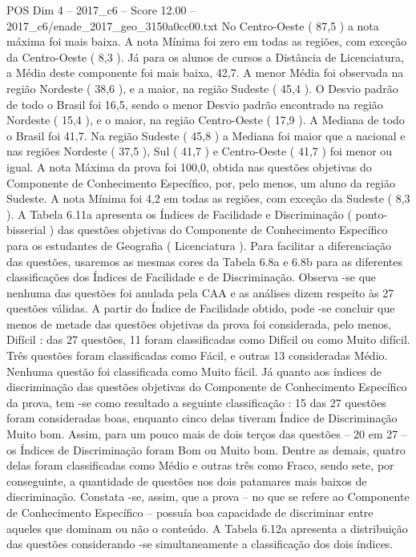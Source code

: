 \begin{textsample}{POS Dim 4 – 2017\_c6 – Score 12.00 – 2017\_c6/enade\_2017\_geo\_3150a0cc00.txt}
No Centro-Oeste ( 87,5 ) a nota máxima foi mais baixa.
A nota Mínima foi zero em todas as regiões, com exceção da Centro-Oeste ( 8,3 ).
Já para os alunos de cursos a Distância de Licenciatura, a Média deste componente foi mais baixa, 42,7.
A menor Média foi observada na região Nordeste ( 38,6 ), e a maior, na região Sudeste ( 45,4 ).
O Desvio padrão de todo o Brasil foi 16,5, sendo o menor Desvio padrão encontrado na região Nordeste ( 15,4 ), e o maior, na região Centro-Oeste ( 17,9 ).
A Mediana de todo o Brasil foi 41,7.
Na região Sudeste ( 45,8 ) a Mediana foi maior que a nacional e nas regiões Nordeste ( 37,5 ), Sul ( 41,7 ) e Centro-Oeste ( 41,7 ) foi menor ou igual.
A nota Máxima da prova foi 100,0, obtida nas questões objetivas do Componente de Conhecimento Específico, por, pelo menos, um aluno da região Sudeste.
A nota Mínima foi 4,2 em todas as regiões, com exceção da Sudeste ( 8,3 ).
A Tabela 6.11a apresenta os Índices de Facilidade e Discriminação ( ponto-bisserial ) das questões objetivas do Componente de Conhecimento Específico para os estudantes de Geografia ( Licenciatura ).
Para facilitar a diferenciação das questões, usaremos as mesmas cores da Tabela 6.8a e 6.8b para as diferentes classificações dos Índices de Facilidade e de Discriminação.
Observa -se que nenhuma das questões foi anulada pela CAA e as análises dizem respeito às 27 questões válidas.
A partir do Índice de Facilidade obtido, pode -se concluir que menos de metade das questões objetivas da prova foi considerada, pelo menos, Difícil : das 27 questões, 11 foram classificadas como Difícil ou como Muito difícil.
Três questões foram classificadas como Fácil, e outras 13 consideradas Médio.
Nenhuma questão foi classificada como Muito fácil.
Já quanto aos índices de discriminação das questões objetivas do Componente de Conhecimento Específico da prova, tem -se como resultado a seguinte classificação : 15 das 27 questões foram consideradas boas, enquanto cinco delas tiveram Índice de Discriminação Muito bom.
Assim, para um pouco mais de dois terços das questões – 20 em 27 – os Índices de Discriminação foram Bom ou Muito bom.
Dentre as demais, quatro delas foram classificadas como Médio e outras três como Fraco, sendo sete, por conseguinte, a quantidade de questões nos dois patamares mais baixos de discriminação.
Constata -se, assim, que a prova – no que se refere ao Componente de Conhecimento Específico – possuía boa capacidade de discriminar entre aqueles que dominam ou não o conteúdo.
A Tabela 6.12a apresenta a distribuição das questões considerando -se simultaneamente a classificação dos dois índices.

\end{textsample}
